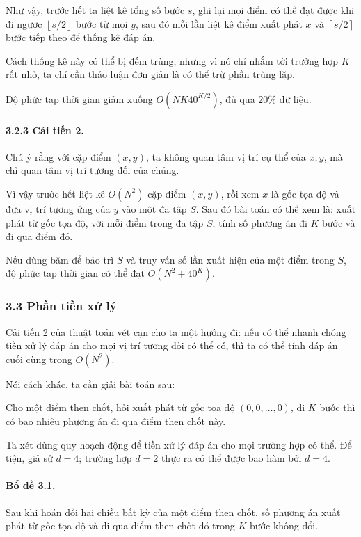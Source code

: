 \documentclass[11pt]{article}
\begin{document}
Như vậy, trước hết ta liệt kê tổng số bước \(s\), ghi lại mọi điểm có thể đạt
được khi đi ngược \(\left\lfloor s/2\right\rfloor\) bước từ mọi \(y\), sau đó
mỗi lần liệt kê điểm xuất phát \(x\) và \(\left\lceil s/2\right\rceil\) bước
tiếp theo để thống kê đáp án.

Cách thống kê này có thể bị đếm trùng, nhưng vì nó chỉ nhắm tới trường hợp
\(K\) rất nhỏ, ta chỉ cần thảo luận đơn giản là có thể trừ phần trùng lặp.

Độ phức tạp thời gian giảm xuống \(O(NK40^{K/2})\), đủ qua \(20\%\) dữ liệu.

\paragraph{3.2.3 Cải tiến 2.}
Chú ý rằng với cặp điểm \((x,y)\), ta không quan tâm vị trí cụ thể của \(x,y\),
mà chỉ quan tâm vị trí tương đối của chúng.

Vì vậy trước hết liệt kê \(O(N^2)\) cặp điểm \((x,y)\), rồi xem \(x\) là gốc
tọa độ và đưa vị trí tương ứng của \(y\) vào một đa tập \(S\). Sau đó bài toán
có thể xem là: xuất phát từ gốc tọa độ, với mỗi điểm trong đa tập \(S\), tính
số phương án đi \(K\) bước và đi qua điểm đó.

Nếu dùng băm để bảo trì \(S\) và truy vấn số lần xuất hiện của một điểm trong
\(S\), độ phức tạp thời gian có thể đạt \(O(N^2+40^K)\).

\subsubsection*{3.3 Phần tiền xử lý}

Cải tiến 2 của thuật toán vét cạn cho ta một hướng đi: nếu có thể nhanh chóng
tiền xử lý đáp án cho mọi vị trí tương đối có thể có, thì ta có thể tính đáp án
cuối cùng trong \(O(N^2)\).

Nói cách khác, ta cần giải bài toán sau:

Cho một điểm then chốt, hỏi xuất phát từ gốc tọa độ \((0,0,\ldots,0)\), đi
\(K\) bước thì có bao nhiêu phương án đi qua điểm then chốt này.

Ta xét dùng quy hoạch động để tiền xử lý đáp án cho mọi trường hợp có thể.
Để tiện, giả sử \(d=4\); trường hợp \(d=2\) thực ra có thể được bao hàm bởi
\(d=4\).

\paragraph{Bổ đề 3.1.}
Sau khi hoán đổi hai chiều bất kỳ của một điểm then chốt, số phương án xuất
phát từ gốc tọa độ và đi qua điểm then chốt đó trong \(K\) bước không đổi.
\end{document}
